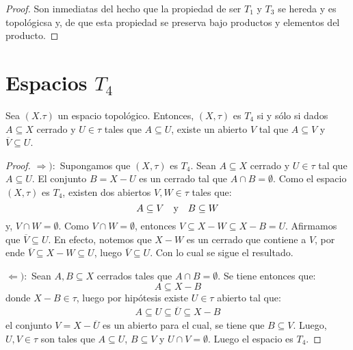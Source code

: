 \documentclass[12pt]{report}
\theoremstyle{largebreak}
\newcommand{\Cls}[1]{\ensuremath{\overline{#1}}}
\begin{document}
    \begin{proof}
        Son inmediatas del hecho que la propiedad de ser $T_1$ y $T_3$ se hereda y es topológicsa y, de que esta propiedad se preserva bajo productos y elementos del producto.
    \end{proof}

    \section{Espacios $T_4$}

    \begin{propo}
        Sea $(X.\tau)$ un espacio topológico. Entonces, $(X,\tau)$ es $T_4$ si y sólo si dados $A\subseteq X$ cerrado y $U\in\tau$ tales que $A\subseteq U$, existe un abierto $V$ tal que $A\subseteq V$ y $\Cls{V}\subseteq U$. 
    \end{propo}

    \begin{proof}
        $\Rightarrow):$ Supongamos que $(X,\tau)$ es $T_4$. Sean $A\subseteq X$ cerrado y $U\in\tau$ tal que $A\subseteq U$. El conjunto $B=X-U$ es un cerrado tal que $A\cap B=\emptyset$. Como el espacio $(X,\tau)$ es $T_4$, existen dos abiertos $V,W\in\tau$ tales que:
        \begin{equation*}
            A\subseteq V\quad\textup{y}\quad B\subseteq W
        \end{equation*}
        y, $V\cap W=\emptyset$. Como $V\cap W=\emptyset$, entonces $V\subseteq X-W\subseteq X-B= U$. Afirmamos que $\Cls{V}\subseteq U$. En efecto, notemos que $X-W$ es un cerrado que contiene a $V$, por ende $\Cls{V}\subseteq X-W\subseteq U$, luego $\Cls{V}\subseteq U$. Con lo cual se sigue el resultado.
        
        $\Leftarrow):$ Sean $A,B\subseteq X$ cerrados tales que $A\cap B=\emptyset$. Se tiene entonces que:
        \begin{equation*}
            A\subseteq X-B
        \end{equation*}
        donde $X-B\in\tau$, luego por hipótesis existe $U\in\tau$ abierto tal que:
        \begin{equation*}
            \begin{split}
                A\subseteq U\subseteq\Cls{U}\subseteq X-B
            \end{split}
        \end{equation*}
        el conjunto $V=X-\Cls{U}$ es un abierto para el cual, se tiene que $B\subseteq V$. Luego, $U,V\in\tau$ son tales que $A\subseteq U$, $B\subseteq V$ y $U\cap V=\emptyset$. Luego el espacio es $T_4$.
    \end{proof}
\end{document}
